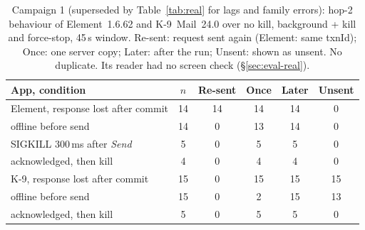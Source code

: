 \begin{table}[!htbp]
\centering
\caption{Campaign 1 (superseded by Table~\ref{tab:real} for lags and family errors): hop-2 behaviour of Element~1.6.62 and K-9~Mail~24.0 over no kill, background + kill and force-stop, 45\,s window. Re-sent: request sent again (Element: same txnId); Once: one server copy; Later: after the run; Unsent: shown as unsent. No duplicate. Its reader had no screen check (\S\ref{sec:eval-real}).}
\label{tab:realcone}
\footnotesize
\setlength{\tabcolsep}{2.4pt}
\begin{tabular}{@{}l ccccc@{}}
\toprule
App, condition & $n$ & Re-sent & Once & Later & Unsent \\
\midrule
Element, response lost after commit & 14 & 14 & 14 & 14 & 0 \\
\quad offline before send & 14 & 0 & 13 & 14 & 0 \\
\quad SIGKILL 300\,ms after \emph{Send} & 5 & 0 & 5 & 5 & 0 \\
\quad acknowledged, then kill & 4 & 0 & 4 & 4 & 0 \\
K-9, response lost after commit & 15 & 0 & 15 & 15 & 15 \\
\quad offline before send & 15 & 0 & 2 & 15 & 13 \\
\quad acknowledged, then kill & 5 & 0 & 5 & 5 & 0 \\
\bottomrule
\end{tabular}
\end{table}

